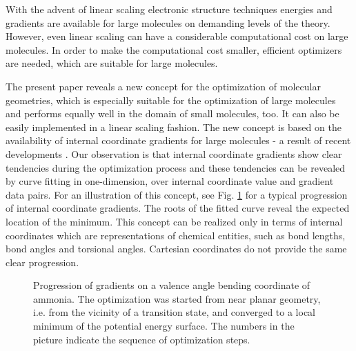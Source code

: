\documentclass[prl,aps,twocolumn,showpacs,twocolumngrid,superbib]{revtex4}
\begin{document}
With the advent of linear scaling electronic structure techniques 
\cite{Goedecker99}
energies and gradients are available for large molecules on demanding
levels of the theory. However, even linear scaling can have 
a considerable computational cost on large molecules. In order to
make the computational cost smaller, efficient optimizers are
needed, which are suitable for large molecules.

The present paper reveals a new concept for the optimization of
molecular geometries, which is especially suitable for the
optimization of large molecules and performs equally well in the
domain of small molecules, too. It can also be easily implemented
in a linear scaling fashion.
The new concept is based on the availability of internal coordinate
gradients for large molecules - a result of recent developments
\cite{paizs_coordtrf1,nemeth_coordtrf1,paizs_coordtrf2,nemeth_coordtrf2,billeter_coordtrf,andzelm_coordtrf,kudin_coordtrf}.
Our observation is that internal coordinate gradients show clear
tendencies during the optimization process and these tendencies can be revealed
by curve fitting in one-dimension, over internal coordinate value and gradient
data pairs. For an illustration of this concept,
see Fig. \ref{NH3outp6} for a typical progression of internal coordinate
gradients. The roots of the fitted curve reveal the expected location
of the minimum. This concept can be realized only in terms of
internal coordinates which are representations of chemical entities, such as
bond lengths, bond angles and torsional angles. Cartesian
coordinates do not provide the same clear progression.
\begin{figure}[h]
\caption{
\small  
Progression of gradients on a valence angle bending coordinate of
ammonia. The optimization was started from near planar geometry, i.e.
from the vicinity of a transition state, and converged to a local 
minimum of the potential energy surface. The numbers in the picture
indicate the sequence of optimization steps.
\label{NH3outp6}
}
\end{figure}
\end{document}
